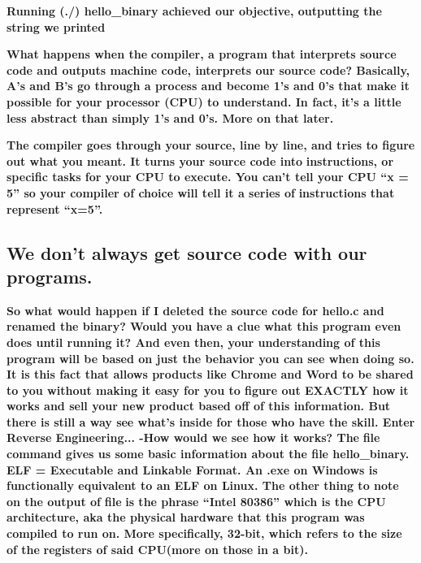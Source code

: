 \documentclass[letterpaper]{article}
\begin{document}
\textbf{Running (./) hello\_binary achieved our objective, outputting the string we printed}

\textbf{What happens when the }\textbf{\textcolor[rgb]{0.21960784,0.4627451,0.11372549}{compiler}}\textbf{, a program
that interprets source code and outputs machine code, interprets our source code? Basically, A's and B's go through a
process and become 1's and 0's that make it possible for your processor (CPU) to understand. In fact, it's a little
less abstract than simply 1's and 0's. More on that later. }

\textbf{The compiler goes through your source, line by line, and tries to figure out what you meant. It turns your
source code into }\textbf{\textcolor[rgb]{0.21960784,0.4627451,0.11372549}{instructions}}\textbf{, or specific tasks
for your CPU to execute. You can't tell your CPU ``x = 5'' so your compiler of choice will tell it a series of
}\textbf{\textcolor[rgb]{0.21960784,0.4627451,0.11372549}{instructions }}\textbf{that represent ``x=5''.}

\subsection{We don't always get source code with our programs.}

\textbf{\newline
So what would happen if I deleted the source code for hello.c and renamed the binary? Would you have a clue what this
program even does until running it? And even then, your understanding of this program will be based on just the
behavior you can see when doing so. It is this fact that allows products like Chrome and Word to be shared to you
without making it easy for you to figure out EXACTLY how it works and sell your new product based off of this
information.  But there is still a way see what's inside for those who have the skill. Enter Reverse
Engineering...\newline
\newline
{}-How would we see how it works? The }\textbf{\textcolor[rgb]{0.21960784,0.4627451,0.11372549}{file }}\textbf{command
gives us some basic information about the file hello\_binary. ELF = Executable and Linkable Format. An .exe on Windows
is functionally equivalent to an ELF on Linux. The other thing to note on the output of
}\textbf{\textcolor[rgb]{0.21960784,0.4627451,0.11372549}{file}}\textbf{ is the phrase ``Intel 80386'' which is the CPU
}\textbf{\textcolor[rgb]{0.21960784,0.4627451,0.11372549}{architecture, }}\textbf{aka the physical hardware that this
program was compiled to run on. More specifically, 32-bit, which refers to the size of the
}\textbf{\textcolor[rgb]{0.21960784,0.4627451,0.11372549}{registers }}\textbf{of said CPU(more on those in a bit).}
\end{document}
